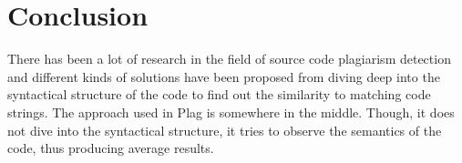 \documentclass[12pt]{article}
\begin{document}
\section{Conclusion}
There has been a lot of research in the field of source code plagiarism detection and different kinds of solutions have been proposed from diving deep into the syntactical structure of the code to find out the similarity to matching code strings. The approach used in Plag is somewhere in the middle. Though, it does not dive into the syntactical structure, it tries to observe the semantics of the code, thus producing average results.

\newpage



\end{document}
